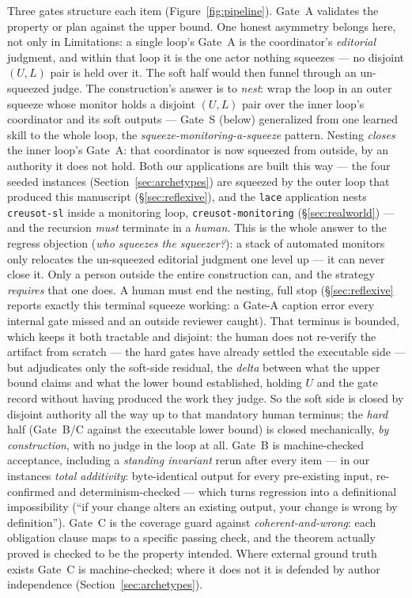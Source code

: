 \documentclass[11pt]{article}
\newcommand{\code}[1]{\texttt{#1}}
\begin{document}
Three gates structure each item (Figure~\ref{fig:pipeline}). Gate~A validates the property or
plan against the upper bound. One honest asymmetry belongs here, not only in Limitations:
a single loop's Gate~A is the coordinator's \emph{editorial} judgment, and within that loop it is
the one actor nothing squeezes --- no disjoint $(U,L)$ pair is held over it. The soft half would
then funnel through an un-squeezed judge. The construction's answer is to \emph{nest}: wrap the
loop in an outer squeeze whose monitor holds a disjoint $(U,L)$ pair over the inner loop's
coordinator and its soft outputs --- Gate~S (below) generalized from one learned skill to the
whole loop, the \emph{squeeze-monitoring-a-squeeze} pattern. Nesting \emph{closes} the inner
loop's Gate~A: that coordinator is now squeezed from outside, by an authority it does not hold.
Both our applications are built this way --- the four seeded instances
(Section~\ref{sec:archetypes}) are squeezed by the outer
loop that produced this manuscript (\S\ref{sec:reflexive}), and the \code{lace} application nests
\code{creusot-sl} inside a monitoring loop, \code{creusot-monitoring} (\S\ref{sec:realworld}) ---
and the recursion \emph{must} terminate in a \emph{human}. This is the whole answer to the regress
objection (\emph{who squeezes the squeezer?}): a stack of automated monitors only relocates the
un-squeezed editorial judgment one level up --- it can never close it. Only a person outside the
entire construction can, and the strategy \emph{requires} that one does. A human must end the
nesting, full stop (\S\ref{sec:reflexive} reports exactly this terminal squeeze working:
a Gate-A caption error every internal gate missed and an outside reviewer caught). That terminus
is bounded, which keeps it both tractable and disjoint: the human does not re-verify the artifact
from scratch --- the hard gates have already settled the executable side --- but adjudicates only
the soft-side residual, the \emph{delta} between what the upper bound claims and what the lower
bound established, holding $U$ and the gate record without having produced the work they judge. So the soft
side is closed by disjoint authority all the way up to that mandatory human terminus; the \emph{hard} half
(Gate~B/C against the executable lower bound) is closed mechanically, \emph{by construction}, with
no judge in the loop at all. Gate~B is machine-checked acceptance, including
a \emph{standing
invariant} rerun after every item --- in our instances \emph{total additivity}: byte-identical
output for every pre-existing input, re-confirmed and determinism-checked --- which turns
regression into a definitional impossibility (``if your change alters an existing output, your
change is wrong by definition''). Gate~C is the coverage guard against \emph{coherent-and-wrong}:
each obligation clause maps to a specific passing check, and the theorem actually proved is
checked to be the property intended. Where external ground truth exists Gate~C is
machine-checked; where it does not it is defended by author independence
(Section~\ref{sec:archetypes}).
\end{document}

